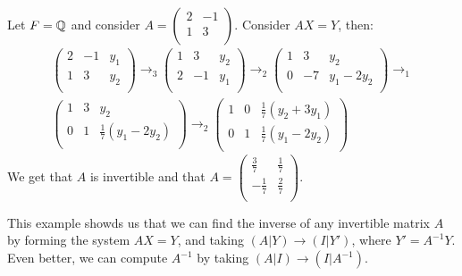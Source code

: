 \begin{example}
    Let $F=\mathbb{Q}$ and consider  $A=\begin{pmatrix} 2 & -1 \\ 1 & 3 \\ \end{pmatrix}$. Consider $AX=Y$,
    then:
        \begin{align*}
            \begin{pmatrix}
                2 & -1 & y_1 \\
                1 & 3 & y_2 \\
            \end{pmatrix} \rightarrow_3
            \begin{pmatrix}
                1 & 3 & y_2 \\
                2 & -1 & y_1 \\
            \end{pmatrix} \rightarrow_2
            \begin{pmatrix}
                1 & 3 & y_2 \\
                0 & -7 & y_1-2y_2 \\
            \end{pmatrix} \rightarrow_1 \\
            \begin{pmatrix}
                1 & 3 & y_2 \\
                0 & 1 & \frac{1}{7}(y_1-2y_2) \\
            \end{pmatrix} \rightarrow_2
            \begin{pmatrix}
                1 & 0 & \frac{1}{7}(y_2+3y_1) \\
                0 & 1 & \frac{1}{7}(y_1-2y_2) \\
            \end{pmatrix}
        \end{align*}
    We get that $A$ is invertible and that $A=\begin{pmatrix} \frac{3}{7} & \frac{1}{7} 
    \\ -\frac{1}{7} & \frac{2}{7} \\ \end{pmatrix}$. 
\end{example}

This example showds us that we can find the inverse of any invertible matrix $A$ by forming the
system  $AX=Y$, and taking  $(A|Y) \rightarrow (I|Y')$, where $Y'=A^{-1}Y$. Even better, we can
compute $A^{-1}$ by taking $(A|I) \rightarrow (I|A^{-1})$.
